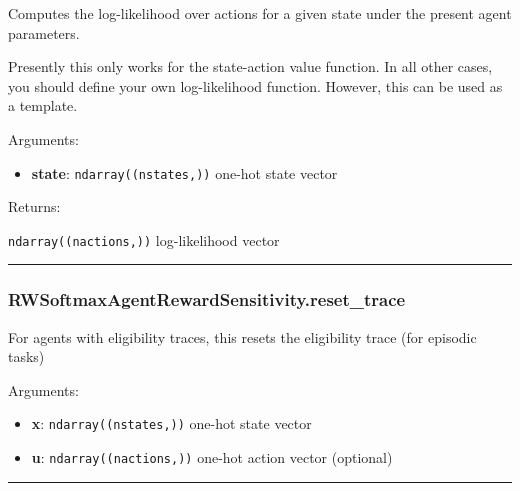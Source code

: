 Computes the log-likelihood over actions for a given state under the
present agent parameters.

Presently this only works for the state-action value function. In all
other cases, you should define your own log-likelihood function.
However, this can be used as a template.

Arguments:

\begin{itemize}
\tightlist
\item
  \textbf{state}: \texttt{ndarray((nstates,))} one-hot state vector
\end{itemize}

Returns:

\texttt{ndarray((nactions,))} log-likelihood vector

\begin{center}\rule{0.5\linewidth}{\linethickness}\end{center}

\hypertarget{rwsoftmaxagentrewardsensitivity.reset_trace}{%
\subsubsection{RWSoftmaxAgentRewardSensitivity.reset\_trace}\label{rwsoftmaxagentrewardsensitivity.reset_trace}}

\begin{Shaded}
\begin{Highlighting}[]
\OperatorTok{=}\NormalTok{)}
\end{Highlighting}
\end{Shaded}

For agents with eligibility traces, this resets the eligibility trace
(for episodic tasks)

Arguments:

\begin{itemize}
\tightlist
\item
  \textbf{x}: \texttt{ndarray((nstates,))} one-hot state vector
\item
  \textbf{u}: \texttt{ndarray((nactions,))} one-hot action vector
  (optional)
\end{itemize}

\begin{center}\rule{0.5\linewidth}{\linethickness}\end{center}
